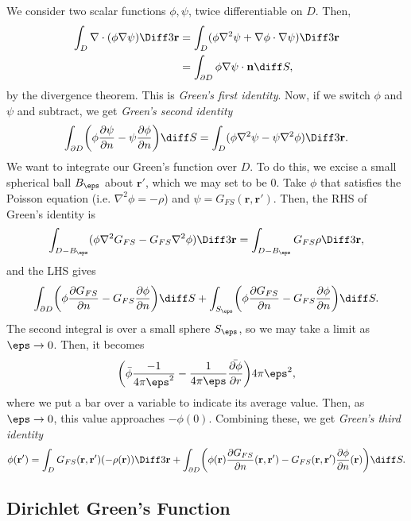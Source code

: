 \documentclass[12pt]{article}
\begin{document}
We consider two scalar functions $\phi, \psi$, twice differentiable on $D$. Then,
\begin{align*}
	\int_{D} \nabla \cdot(\phi \nabla \psi) \Diff3 \mathbf{r} &= \int_{D}(\phi \nabla^2 \psi + \nabla \phi \cdot \nabla \psi)\Diff3 \mathbf{r} \\
								  &= \int_{\partial D} \phi \nabla \psi \cdot \mathbf{n} \diff S,
\end{align*}
by the divergence theorem. This is \textit{Green's first identity}. Now, if we switch $\phi$ and $\psi$ and subtract, we get \textit{Green's second identity}
\[
	\int_{\partial D} \biggl( \phi \frac{\partial \psi}{\partial n} - \psi \frac{\partial \phi}{\partial n} \biggr) \diff S = \int_{D} (\phi \nabla^2 \psi - \psi \nabla^2 \phi) \Diff3 \mathbf{r}
.\]
We want to integrate our Green's function over $D$. To do this, we excise a small spherical ball $B_{\eps}$ about $\mathbf{r}'$, which we may set to be $0$. Take $\phi$ that satisfies the Poisson equation (i.e. $\nabla^2 \phi = - \rho$) and $\psi = G_{FS}(\mathbf{r}, \mathbf{r}')$. Then, the RHS of Green's identity is
\[
	\int_{D - B_{\eps}}(\phi \nabla^2 G_{FS} - G_{FS} \nabla^2 \phi) \Diff3 \mathbf{r} = \int_{D - B_{\eps}}G_{FS} \rho \Diff3 \mathbf{r}
,\]
and the LHS gives
\[
	\int_{\partial D} \biggl( \phi \frac{\partial G_{FS}}{\partial n} - G_{FS} \frac{\partial \phi}{\partial n} \biggr) \diff S + \int_{S_{\eps}} \biggl( \phi \frac{\partial G_{FS}}{\partial n} - G_{FS} \frac{\partial \phi}{\partial n} \biggr) \diff S
.\]
The second integral is over a small sphere $S_{\eps}$, so we may take a limit as $\eps \to 0$. Then, it becomes
\[
	\biggl( \bar \phi \frac{-1}{4 \pi \eps^2} - \frac{1}{4 \pi \eps} \bar{\frac{\partial \phi}{\partial r}} \biggr) 4 \pi \eps^2
,\]
where we put a bar over a variable to indicate its average value. Then, as $\eps \to 0$, this value approaches $- \phi(0)$. Combining these, we get \textit{Green's third identity}
\[
	\phi(\mathbf{r}') = \int_{D}G_{FS}(\mathbf{r}, \mathbf{r}')(-\rho(\mathbf{r}))\Diff3 \mathbf{r} + \int_{\partial D} \biggl( \phi(\mathbf{r}) \frac{\partial G_{FS}}{\partial n}(\mathbf{r}, \mathbf{r}') - G_{FS}(\mathbf{r}, \mathbf{r}') \frac{\partial \phi}{\partial n}(\mathbf{r}) \biggr) \diff S
.\]

\subsection{Dirichlet Green's Function}%
\label{sub:dirichlet_green_s_function}
\end{document}
